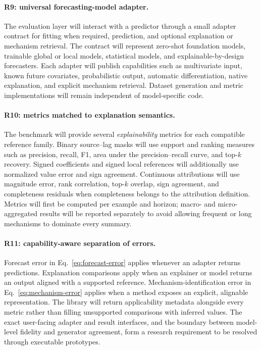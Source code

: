 \paragraph{R9: universal forecasting-model adapter.}
The evaluation layer will interact with a predictor through a small adapter
contract for fitting when required, prediction, and optional explanation or
mechanism retrieval. The contract will represent zero-shot foundation models,
trainable global or local models, statistical models, and
explainable-by-design forecasters. Each adapter will publish capabilities such
as multivariate input, known future covariates, probabilistic output,
automatic differentiation, native explanation, and explicit mechanism
retrieval. Dataset generation and metric implementations will remain
independent of model-specific code.

\paragraph{R10: metrics matched to explanation semantics.}
The benchmark will provide several \emph{explainability} metrics for each
compatible reference family. Binary source--lag masks will use support and
ranking measures such as precision, recall, F1, area under the precision--recall
curve, and top-$k$ recovery. Signed coefficients and signed local references
will additionally use normalized value error and sign agreement. Continuous
attributions will use magnitude error, rank correlation, top-$k$ overlap, sign
agreement, and completeness residuals when completeness belongs to the
attribution definition. Metrics will first be computed per example and
horizon; macro- and micro-aggregated results will be reported separately to
avoid allowing frequent or long mechanisms to dominate every summary.

\paragraph{R11: capability-aware separation of errors.}
Forecast error in Eq.~\eqref{eq:forecast-error} applies whenever an adapter
returns predictions. Explanation comparisons apply when an explainer or model
returns an output aligned with a supported reference. Mechanism-identification
error in Eq.~\eqref{eq:mechanism-error} applies when a method exposes an
explicit, alignable representation. The library will return applicability
metadata alongside every metric rather than filling unsupported comparisons
with inferred values. The exact user-facing adapter and result interfaces, and
the boundary between model-level fidelity and generator agreement, form a
research requirement to be resolved through executable prototypes.

